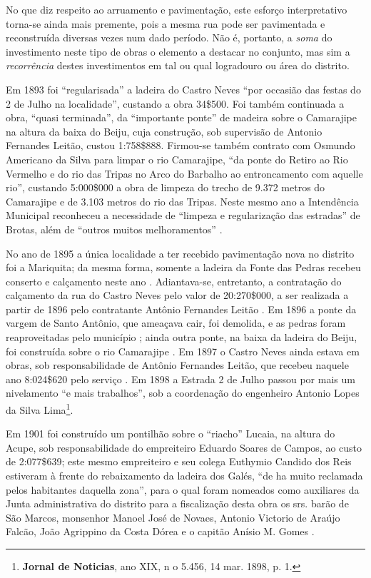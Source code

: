 No que diz respeito ao arruamento e pavimentação, este esforço interpretativo torna-se ainda mais premente, pois a mesma rua pode ser pavimentada e reconstruída diversas vezes num dado período. Não é, portanto, a \textit{soma} do investimento neste tipo de obras o elemento a destacar no conjunto, mas sim a \textit{recorrência} destes investimentos em tal ou qual logradouro ou área do distrito.

Em 1893 foi “regularisada” a ladeira do Castro Neves “por occasião das festas
do 2 de Julho na localidade”, custando a obra 34\$500. Foi também continuada a obra, “quasi terminada”, da “importante ponte” de madeira sobre o Camarajipe na altura da baixa do Beiju, cuja construção, sob supervisão de Antonio Fernandes Leitão, custou 1:758\$888. Firmou-se também contrato com Osmundo Americano da Silva para limpar o rio Camarajipe, “da ponte do Retiro ao Rio Vermelho e do rio das Tripas no Arco do Barbalho ao entroncamento com aquelle rio”, custando 5:000\$000 a obra de limpeza do trecho de 9.372 metros do Camarajipe e de 3.103 metros do rio das Tripas. Neste mesmo ano a Intendência Municipal reconheceu a necessidade de “limpeza e regularização das estradas” de Brotas, além de “outros muitos melhoramentos” \cite[pp.~47-48; anexo 3, pp.~18-19]{salvador_relatorio_1893}.

No ano de 1895 a única localidade a ter recebido pavimentação nova no distrito foi a Mariquita; da mesma forma, somente a ladeira da Fonte das
Pedras recebeu conserto e calçamento neste ano \cite[p.~16]{salvador_relatorio_1895}. Adiantava-se, entretanto, a contratação do calçamento da rua do Castro Neves pelo valor de 20:270\$000, a ser realizada a partir de 1896 pelo contratante Antônio Fernandes Leitão \cite[p.~23]{salvador_relatorio_1895}. Em 1896 a ponte da vargem de Santo Antônio, que ameaçava cair, foi demolida, e as pedras foram reaproveitadas pelo município \cite[p.~137]{salvador_relatorio_1895}; ainda outra ponte, na baixa da ladeira do Beiju, foi construída sobre o rio Camarajipe \cite[p.~156]{salvador_relatorio_1894}. Em 1897 o Castro Neves ainda estava em obras, sob responsabilidade de Antônio Fernandes Leitão, que recebeu naquele ano 8:024\$620 pelo serviço \cite[p.~99]{salvador_relatorio_1897}. Em 1898 a Estrada 2 de Julho passou por mais um nivelamento “e mais trabalhos”, sob a coordenação do engenheiro Antonio Lopes da Silva Lima\footnote{\textbf{Jornal de Noticias}, ano XIX, n o 5.456, 14 mar. 1898, p. 1.}.

Em 1901 foi construído um pontilhão sobre o “riacho” Lucaia, na altura do Acupe, sob responsabilidade do empreiteiro Eduardo Soares de Campos, ao custo de 2:077\$639; este mesmo empreiteiro e seu colega Euthymio Candido dos Reis estiveram à frente do rebaixamento da ladeira dos Galés, “de ha muito reclamada pelos habitantes daquella zona”, para o qual foram nomeados como auxiliares da Junta administrativa do distrito para a fiscalização desta obra os srs. barão de São Marcos, monsenhor Manoel José de Novaes, Antonio Victorio de Araújo Falcão, João Agrippino da Costa Dórea e o capitão Anísio M. Gomes \cite[pp.~15, 162, 249-250]{salvador_relatorio_1901}.

